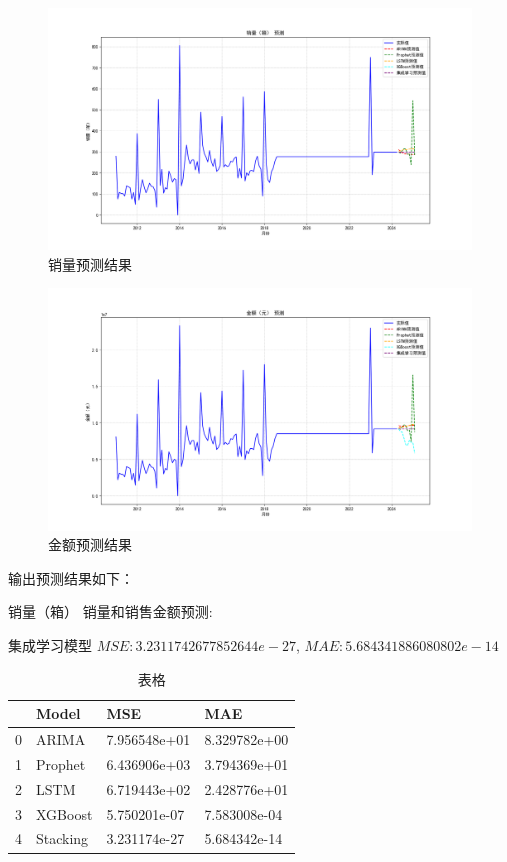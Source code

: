 \documentclass[a4paper]{article}
\begin{document}
	\begin{figure}[H]
		\centering
		\includegraphics[width=1.0\textwidth]{img/3_1.png}
		\caption{销量预测结果}
	\end{figure}
	\begin{figure}[H]
		\centering
		\includegraphics[width=1.0\textwidth]{img/3_2.png}
		\caption{金额预测结果}
	\end{figure}
	输出预测结果如下：

	销量（箱） 销量和销售金额预测:

	集成学习模型 $MSE: 3.2311742677852644e-27$, $MAE: 5.684341886080802e-14$
	
	\begin{table}[H]

		\centering
	
		\begin{tabularx}{\textwidth}{|X|X|X|X|} %
	
		\hline
	
			&Model   &        MSE        &   MAE\\
		\hline
		0   &  ARIMA & 7.956548e+01 & 8.329782e+00\\
		\hline
		1  & Prophet&  6.436906e+03 & 3.794369e+01\\
		\hline
		2  &    LSTM & 6.719443e+02 & 2.428776e+01\\
		\hline
		3  & XGBoost & 5.750201e-07 & 7.583008e-04\\
		\hline
		4  &Stacking&  3.231174e-27 & 5.684342e-14\\
	
		\hline
		\end{tabularx}
	
		\caption{表格}
	
	\end{table}
\end{document}
